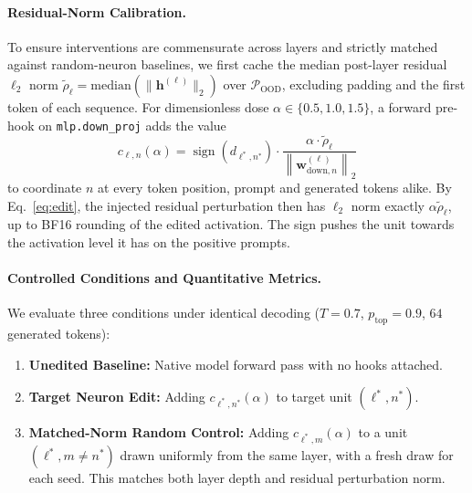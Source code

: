 \documentclass[11pt, a4paper]{article}
\begin{document}
\paragraph{Residual-Norm Calibration.} To ensure interventions are commensurate across layers and strictly matched against random-neuron baselines, we first cache the median post-layer residual $\ell_2$ norm $\tilde{\rho}_\ell = \mathrm{median}(\|\mathbf{h}^{(\ell)}\|_2)$ over $\mathcal{P}_{\mathrm{OOD}}$, excluding padding and the first token of each sequence. For dimensionless dose $\alpha \in \{0.5, 1.0, 1.5\}$, a forward pre-hook on \texttt{mlp.down\_proj} adds the value
\begin{equation}\label{eq:push}
    c_{\ell,n}(\alpha) = \operatorname{sign}(d_{\ell^*,n^*}) \cdot \frac{\alpha \cdot \tilde{\rho}_\ell}{\left\|\mathbf{w}_{\mathrm{down}, n}^{(\ell)}\right\|_2}
\end{equation}
to coordinate $n$ at every token position, prompt and generated tokens alike. By Eq.~\eqref{eq:edit}, the injected residual perturbation then has $\ell_2$ norm exactly $\alpha \tilde{\rho}_\ell$, up to BF16 rounding of the edited activation. The sign pushes the unit towards the activation level it has on the positive prompts.

\paragraph{Controlled Conditions and Quantitative Metrics.} We evaluate three conditions under identical decoding ($T = 0.7$, $p_{\mathrm{top}} = 0.9$, $64$ generated tokens):
\begin{enumerate}[leftmargin=1.5em]
    \item \textbf{Unedited Baseline:} Native model forward pass with no hooks attached.
    \item \textbf{Target Neuron Edit:} Adding $c_{\ell^*, n^*}(\alpha)$ to target unit $(\ell^*, n^*)$.
    \item \textbf{Matched-Norm Random Control:} Adding $c_{\ell^*, m}(\alpha)$ to a unit $(\ell^*, m \neq n^*)$ drawn uniformly from the same layer, with a fresh draw for each seed. This matches both layer depth and residual perturbation norm.
\end{enumerate}
\end{document}
